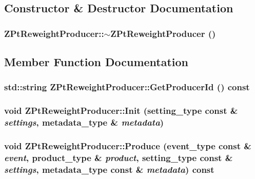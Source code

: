 \subsection{Constructor \& Destructor Documentation}
\hypertarget{classZPtReweightProducer_a4a10d9fc59ccd6e5cdb8f627f87ae390}{
\subsubsection[{$\sim$ZPtReweightProducer}]{\setlength{\rightskip}{0pt plus 5cm}ZPtReweightProducer::$\sim$ZPtReweightProducer ()}}
\label{classZPtReweightProducer_a4a10d9fc59ccd6e5cdb8f627f87ae390}


\subsection{Member Function Documentation}
\hypertarget{classZPtReweightProducer_af8a71db4b608877d853a618ccc2257ce}{
\subsubsection[{GetProducerId}]{\setlength{\rightskip}{0pt plus 5cm}std::string ZPtReweightProducer::GetProducerId () const}}
\label{classZPtReweightProducer_af8a71db4b608877d853a618ccc2257ce}
\hypertarget{classZPtReweightProducer_a57426136c490159fcd836a97fff8da8e}{
\subsubsection[{Init}]{\setlength{\rightskip}{0pt plus 5cm}void ZPtReweightProducer::Init (setting\_\-type const \& {\em settings}, \/  metadata\_\-type \& {\em metadata})}}
\label{classZPtReweightProducer_a57426136c490159fcd836a97fff8da8e}
\hypertarget{classZPtReweightProducer_aa3d766c0f8dc568480f59563bd73a824}{
\subsubsection[{Produce}]{\setlength{\rightskip}{0pt plus 5cm}void ZPtReweightProducer::Produce (event\_\-type const \& {\em event}, \/  product\_\-type \& {\em product}, \/  setting\_\-type const \& {\em settings}, \/  metadata\_\-type const \& {\em metadata}) const}}
\label{classZPtReweightProducer_aa3d766c0f8dc568480f59563bd73a824}


